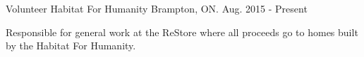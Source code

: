 

\begin{cventries}

  \cventry
    {Volunteer} %
    {Habitat For Humanity} %
    {Brampton, ON.} %
    {Aug. 2015 - Present} %
    {
      \begin{cvitems} %
        \item {Responsible for general work at the ReStore where all proceeds go to homes built by the Habitat For Humanity.}
      \end{cvitems}
    }


\end{cventries}